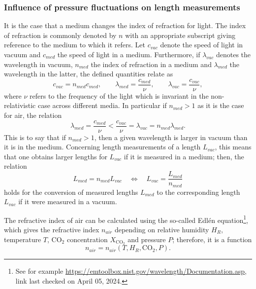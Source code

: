\documentclass{report}
\numberwithin{tm}{section}
\begin{document}
\subsubsection{Influence of pressure fluctuations on length measurements}
It is the case that a medium changes the index of refraction for light. The index of refraction is commonly denoted by $n$ with an appropriate subscript giving reference to the medium to which it refers. Let $c_{vac}$ denote the speed of light in vacuum and $c_{med}$ the speed of light in a medium. Furthermore, if $\lambda_{vac}$ denotes the wavelength in vacuum, $n_{med}$ the index of refraction in a medium and $\lambda_{med}$ the wavelength in the latter, the defined quantities relate as \begin{equation}
	c_{vac} = n_{med}c_{med}, \qquad \lambda_{med} = \frac{c_{med}}{\nu}, \qquad \lambda_{vac} = \frac{c_{vac}}{\nu},
\end{equation} where $\nu$ refers to the frequency of the light which is invariant in the non-relativistic case across different media. In particular if $n_{med} > 1$ as it is the case for air, the relation \begin{equation}
	\lambda_{med} = \frac{c_{med}}{\nu} < \frac{c_{vac}}{\nu} = \lambda_{vac} = n_{med}\lambda_{med}.
\end{equation} This is to say that if $n_{med} > 1$, then a given wavelength is larger in vacuum than it is in the medium. Concerning length measurements of a length $L_{vac}$, this means that one obtains larger lengths for $L_{vac}$ if it is measured in a medium; then, the relation \begin{equation}\label{eq:conversion_medium_to_vacuum}
	L_{med} = n_{med}L_{vac} \quad \Leftrightarrow \quad L_{vac} = \frac{L_{med}}{n_{med}}
\end{equation} holds for the conversion of measured lengths $L_{med}$ to the corresponding length $L_{vac}$ if it were measured in a vacuum.

The refractive index of air can be calculated using the so-called Edlén equation\footnote{See for example \url{https://emtoolbox.nist.gov/wavelength/Documentation.asp}, link last checked on April 05, 2024.}, which gives the refractive index $n_{air}$ depending on relative humidity $H_R$, temperature $T$, $\textrm{CO}_2$ concentration $X_{\textrm{CO}_2}$ and pressure $P$; therefore, it is a function \begin{equation} 
	n_{air} = n_{air}(T, H_R, \textrm{CO}_2, P).
\end{equation}
\end{document}
